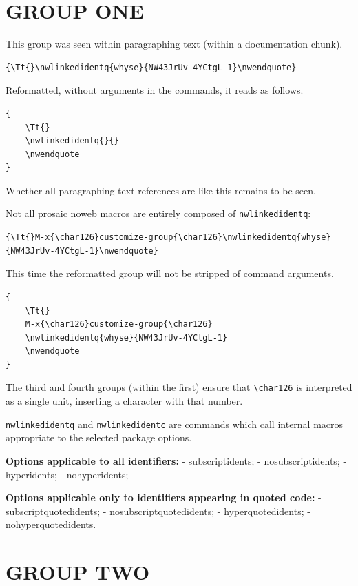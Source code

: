 \section{GROUP ONE}\label{group-one}

This group was seen within paragraphing text (within a documentation
chunk).

\begin{verbatim}
{\Tt{}\nwlinkedidentq{whyse}{NW43JrUv-4YCtgL-1}\nwendquote}
\end{verbatim}

Reformatted, without arguments in the commands, it reads as follows.

\begin{verbatim}
{
    \Tt{}
    \nwlinkedidentq{}{}
    \nwendquote
}
\end{verbatim}

Whether all paragraphing text references are like this remains to be
seen.

Not all prosaic noweb macros are entirely composed of
\texttt{nwlinkedidentq}:

\begin{verbatim}
{\Tt{}M-x{\char126}customize-group{\char126}\nwlinkedidentq{whyse}{NW43JrUv-4YCtgL-1}\nwendquote}
\end{verbatim}

This time the reformatted group will not be stripped of command
arguments.

\begin{verbatim}
{
    \Tt{}
    M-x{\char126}customize-group{\char126}
    \nwlinkedidentq{whyse}{NW43JrUv-4YCtgL-1}
    \nwendquote
}
\end{verbatim}

The third and fourth groups (within the first) ensure that
\texttt{\textbackslash{}char126} is interpreted as a single unit,
inserting a character with that number.

\texttt{nwlinkedidentq} and \texttt{nwlinkedidentc} are commands which
call internal macros appropriate to the selected package options.

\textbf{Options applicable to all identifiers:} - subscriptidents; -
nosubscriptidents; - hyperidents; - nohyperidents;

\textbf{Options applicable only to identifiers appearing in quoted
code:} - subscriptquotedidents; - nosubscriptquotedidents; -
hyperquotedidents; - nohyperquotedidents.

\section{GROUP TWO}\label{group-two}


